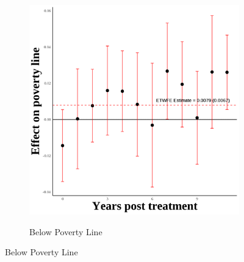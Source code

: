 \documentclass[12pt,english]{article}
\begin{document}
\begin{figure}[H]
\begin{subfigure}[b]{0.3\textwidth}
    \label{fig:snap-third-three}
  \end{subfigure}
  \hfill
  \begin{subfigure}[b]{0.3\textwidth}
    \centering
    \caption{Below Poverty Line}
    \includegraphics[width=\linewidth]{figures/plot78-poverty_line_event_study-third-three.png}
    \label{fig:poverty-line-third-three}
  \end{subfigure}

  \vspace{0.3cm} %


\end{figure}
\end{document}
